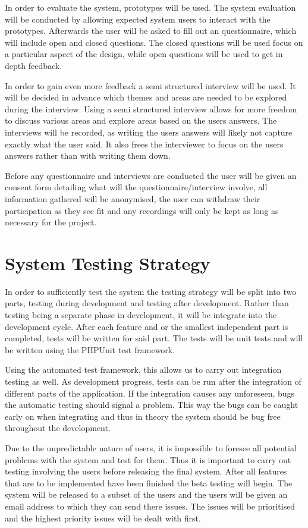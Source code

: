 \documentclass[a4paper,oneside,11pt]{report}
\begin{document}
In order to evaluate the system, prototypes will be used. The system evaluation will be conducted by allowing expected system users to interact with the prototypes. Afterwards the user will be asked to fill out an questionnaire, which will include open and closed questions. The closed questions will be used focus on a particular aspect of the design, while open questions will be used to get in depth feedback. 

In order to gain even more feedback a semi structured interview will be used. It will be decided in advance which themes and areas are needed to be explored during the interview. Using a semi structured interview allows for more freedom to discuss various areas and explore areas based on the users answers. The interviews will be recorded, as writing the users answers will likely not capture exactly what the user said. It also frees the interviewer to focus on the users answers rather than with writing them down.

Before any questionnaire and interviews are conducted the user will be given an consent form detailing what will the questionnaire/interview involve, all information gathered will be anonymised, the user can withdraw their participation as they see fit and any recordings will only be kept as long as necessary for the project.
\section{System Testing Strategy}
In order to sufficiently test the system the testing strategy will be split into two parts, testing during development and testing after development.
Rather than testing being a separate phase in development, it will be integrate into the development cycle. After each feature and or the smallest independent part is completed, tests will be written for said part. The tests will be unit tests and will be written using the PHPUnit test framework. 

Using the automated test framework, this allows us to carry out integration testing as well. As development progress, tests can be run after the integration of different parts of the application. If the integration causes any unforeseen, bugs the automatic testing should signal a problem. This way the bugs can be caught early on when integrating and thus in theory the system should be bug free throughout the development.

Due to the unpredictable nature of users, it is impossible to foresee all potential problems with the system and test for them. Thus it is important to carry out testing involving the users before releasing  the final system. After all features that are to be implemented have been finished the beta testing will begin. The system will be released to a subset of the users and the users will be given an email address to which they can send there issues. The issues will be prioritised and the highest priority issues will be dealt with first.
\end{document}
